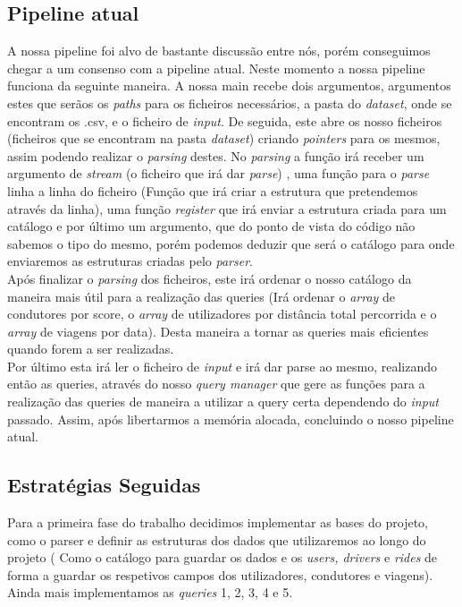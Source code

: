 \documentclass{article}
\begin{document}
        \subsection{Pipeline atual}
            A nossa pipeline foi alvo de bastante discussão entre nós, porém conseguimos chegar a um consenso
            com a pipeline atual. Neste momento a nossa pipeline funciona da seguinte maneira. A nossa main recebe dois argumentos, argumentos estes que serãos os \emph{paths} para os ficheiros necessários, a pasta do \emph{dataset}, onde se encontram os .csv, e o ficheiro de \emph{input}. De seguida, este abre os nosso ficheiros (ficheiros que se encontram na pasta \emph{dataset}) criando \emph{pointers} para os mesmos, assim podendo realizar o \emph{parsing} destes. No \emph{parsing} a função irá receber um argumento de \emph{stream} (o ficheiro que irá dar \emph{parse}) , uma função para o \emph{parse} linha a linha do ficheiro (Função que irá criar a estrutura que pretendemos através da linha), uma função \emph{register} que irá enviar a estrutura criada para um catálogo e por último um argumento, que do ponto de vista do código não sabemos o tipo do mesmo, porém podemos deduzir que será o catálogo para onde enviaremos as estruturas criadas pelo \emph{parser}.
            \\ Após finalizar o \emph{parsing} dos ficheiros, este irá ordenar o nosso catálogo da maneira mais útil para a realização das queries (Irá ordenar o \emph{array} de condutores por score, o \emph{array} de utilizadores por distância total percorrida e o \emph{array} de viagens por data). Desta maneira a tornar as queries mais eficientes quando forem a ser realizadas.
            \\Por último esta irá ler o ficheiro de \emph{input} e irá dar parse ao mesmo, realizando então as queries, através do nosso \emph{query manager} que gere as funções para a realização das queries de maneira a utilizar a query certa dependendo do \emph{input} passado. Assim, após libertarmos a memória alocada, concluindo o nosso pipeline atual.
            
        \subsection{Estratégias Seguidas}

            Para a primeira fase do trabalho decidimos implementar as bases do projeto, como o parser e definir as estruturas dos dados que utilizaremos ao longo do projeto ( Como o catálogo para guardar os dados e os \emph{users, drivers} e \emph{rides} de forma a guardar os respetivos campos dos utilizadores, condutores e viagens). Ainda mais implementamos as \emph{queries} 1, 2, 3, 4 e 5. 
\end{document}

